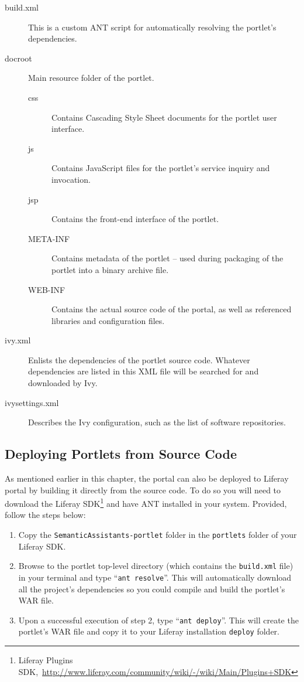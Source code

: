 \begin{description}
\item [build.xml] This is a custom ANT script for automatically resolving the portlet's dependencies.
\item [docroot] Main resource folder of the portlet.
\begin{description}
\item[css] Contains Cascading Style Sheet documents for the portlet user interface.
\item[js] Contains JavaScript files for the portlet's service inquiry and invocation.
\item[jsp] Contains the front-end interface of the portlet.
\item[META-INF] Contains metadata of the portlet -- used during packaging of the portlet into a binary archive file.
\item[WEB-INF] Contains the actual source code of the portal, as well as referenced libraries and configuration files.
\end{description}

\item [ivy.xml] Enlists the dependencies of the portlet source code. Whatever dependencies are listed in this XML file will be searched for and downloaded by Ivy.
\item [ivysettings.xml] Describes the Ivy configuration, such as the list of software repositories.
\end{description}

\subsection{Deploying Portlets from Source Code}
\label{sec:src_deploy}
As mentioned earlier in this chapter, the \sa portal can also be deployed to Liferay portal by building it directly from the source code. To do so you will need to download the Liferay SDK\footnote{Liferay Plugins SDK,~\url{http://www.liferay.com/community/wiki/-/wiki/Main/Plugins+SDK}} and have ANT installed in your system. Provided, follow the steps below:

\begin{enumerate}
\item Copy the \texttt{SemanticAssistants-portlet} folder in the \texttt{portlets} folder of your Liferay SDK.
\item Browse to the \sa portlet top-level directory (which contains the \texttt{build.xml} file) in your terminal and type ``\texttt{ant resolve}''. This will automatically download all the project's dependencies so you could compile and build the portlet's WAR file.
\item Upon a successful execution of step 2, type ``\texttt{ant deploy}''. This will create the portlet's WAR file and copy it to your Liferay installation \texttt{deploy} folder.
\end{enumerate}

